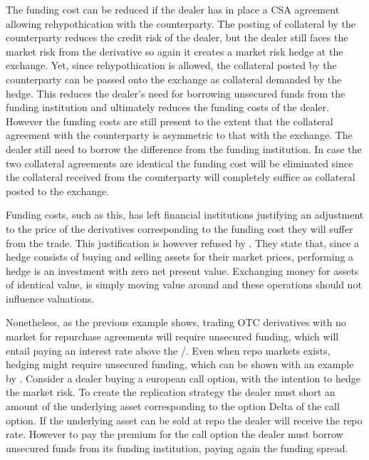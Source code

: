 \documentclass[../../../main.tex]{subfiles}
\begin{document}
        The funding cost can be reduced if the dealer has in place a CSA agreement allowing rehypothication with the counterparty.
        The posting of collateral by the counterparty reduces the credit risk of the dealer,
        but the dealer still faces the market risk from the derivative so again it creates a market risk hedge at the exchange.
        Yet, since rehypothication is allowed,
        the collateral posted by the counterparty can be passed onto the exchange as collateral demanded by the hedge.
        This reduces the dealer's need for borrowing unsecured funds from the funding institution and ultimately reduces the funding costs of the dealer.
        However the funding costs are still present to the extent that the collateral agreement with the counterparty is asymmetric to that with the exchange.
        The dealer still need to borrow the difference from the funding institution.
        In case the two collateral agreements are identical the funding cost will be eliminated since the collateral received from the counterparty will completely suffice as collateral posted to the exchange.

        Funding costs, such as this, has left financial institutions justifying an adjustment to the price of the derivatives
        corresponding to the funding cost they will suffer from the trade.
        This justification is however refused by \cite{HullWhite2012FVA}.
        They state that, since a hedge consists of buying and selling assets for their market prices,
        performing a hedge is an investment with zero net present value.
        Exchanging money for assets of identical value,
        is simply moving value around and these operations should not influence valuations. 

        Nonetheless, as the previous example shows,
        trading OTC derivatives with no market for repurchase agreements will require unsecured funding,
        which will entail paying an interest rate above the \OIS/.
        Even when repo markets exists, hedging might require unsecured funding,
        which can be shown with an example by \cite{Castagna2012FVA}.
        Consider a dealer buying a european call option,
        with the intention to hedge the market risk.
        To create the replication strategy the dealer must short an amount of the underlying asset corresponding to the option Delta of the call option.
        If the underlying asset can be sold at repo the dealer will receive the repo rate.
        However to pay the premium for the call option the dealer must borrow unsecured funds from its funding institution,
        paying again the funding spread. 
\end{document}
